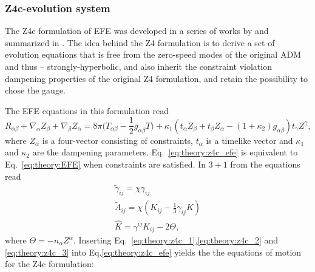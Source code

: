 \subsubsection{Z4c-evolution system}\label{sec:theory:z4c}

The Z4c formulation of \ac{EFE} was developed in a series of works by \citet{Bernuzzi:2009ex,Ruiz:2010qj,Weyhausen:2011cg,Cao:2011fu,Hilditch:2012fp} and 
summarized in \citet{Hilditch:2012fp}. 
%
The idea behind the Z4 formulation is to derive a set of evolution equations that is free from the 
zero-speed modes of the original \ac{ADM} and thus -- strongly-hyperbolic,
and also inherit the constraint violation dampening properties of the original Z4 formulation, and retain the possibility to chose the gauge.

The \ac{EFE} equations in this formulation read 
%
\begin{equation}
    R_{\alpha\beta} + \nabla_{\alpha}Z_{\beta} + \nabla_{\beta}Z_{\alpha} = 8\pi \Big( T_{\alpha\beta} - \frac{1}{2}g_{\alpha\beta}T \Big) + \kappa_1 (t_{\alpha} Z_{\beta} + t_{\beta}Z_{\alpha} - (1+\kappa_2)g_{\alpha\beta})t_{\gamma}Z^{\gamma},
    \label{eq:theory:z4c_efe}
\end{equation}
%
where $Z_{\alpha}$ is a four-vector consisting of constraints, $t_{\alpha}$ is a timelike vector and 
$\kappa_1$ and $\kappa_2$ are the dampening parameters.
Eq.~\eqref{eq:theory:z4c_efe} is equivalent to Eq.~\eqref{eq:theory:EFE} when constraints are satisfied.
%
In $3+1$ from the equations read 
\begin{subequations}
\begin{align}
    \widetilde{\gamma}_{ij} = \chi\gamma_{ij} \label{eq:theory:z4c_1}\\
    \widetilde{A}_{ij} = \chi(K_{ij}-\frac{1}{3}\gamma_{ij}K)\label{eq:theory:z4c_2} \\
    \hat{K} = \gamma^{ij}K_{ij} - 2\Theta,\label{eq:theory:z4c_3}
\end{align}
\end{subequations}
%
where $\Theta=-n_{\alpha}Z^{\alpha}$.
%
Inserting Eq.~\eqref{eq:theory:z4c_1},\eqref{eq:theory:z4c_2} and \eqref{eq:theory:z4c_3} into
Eq.\eqref{eq:theory:z4c_efe} yields the 
the equations of motion for the Z4c formulation:
%
